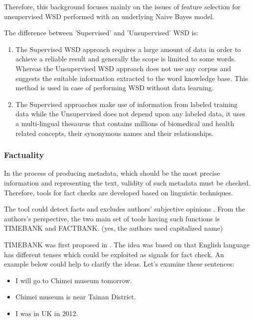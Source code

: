 Therefore, this background focuses mainly on the issues of feature selection for unsupervised WSD performed with an underlying Naive Bayes model.

The difference between 'Supervised' and 'Unsupervised' WSD is:

\begin{enumerate}
	\item The Supervised WSD approach requires a large amount of data in order to achieve a reliable result and generally the scope is limited to some words. 
	Whereas the Unsupervised WSD approach does not use any corpus and suggests the suitable information extracted to the word knowledge base.
	This method is used in case of performing WSD without data learning.
	\item The Supervised approaches make use of information from labeled training data while the Unsupervised does not depend upon any labeled data, it uses a multi-lingual thesaurus that contains millions of biomedical and health related concepts, their synonymous names and their relationships.
\end{enumerate}


\subsubsection*{Factuality}

In the process of producing metadata, which should be the most precise information and representing the text, validity of such metadata must be checked. Therefore, tools for fact checks are developed based on linguistic techniques. 

The tool could detect facts and excludes authors' subjective opinions \cite{Agerri2014}. From the authors's perspective, the two main set of tools having such functions is TIMEBANK and FACTBANK. (yes, the authors used capitalized name)

TIMEBANK was first proposed in \cite{pustejovsky2003timebank}. 
The idea was based on that English language has different tenses which could be exploited as signals for fact check. An example below could help to clarify the ideas. Let's examine these sentences:

\begin{itemize}
	\item I will go to Chimei museum tomorrow.
	\item Chimei museum is near Tainan District.
	\item I was in UK in 2012.
\end{itemize}

